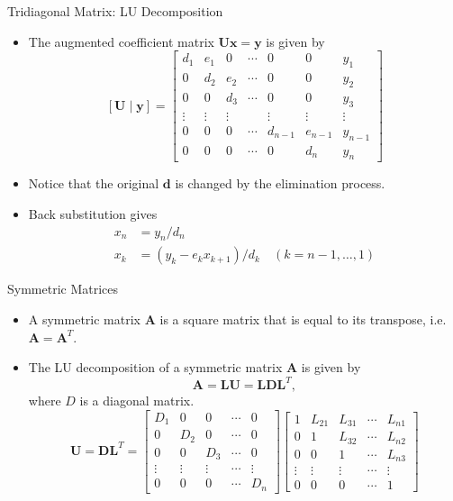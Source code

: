 \documentclass{beamer}
\begin{document}
\begin{frame}{Tridiagonal  Matrix: LU Decomposition}
  \begin{itemize}
\item  The augmented coefficient matrix $\mathbf{U}\mathbf{x}=\mathbf{y}$ is given by 
$$
[\mathbf{U} \mid \mathbf{y}]=\left[\begin{array}{cccccc|c}
d_1 & e_1 & 0 & \cdots & 0 & 0 & y_1 \\
0 & d_2 & e_2 & \cdots & 0 & 0 & y_2 \\
0 & 0 & d_3 & \cdots & 0 & 0 & y_3 \\
\vdots & \vdots & \vdots & & \vdots & \vdots & \vdots \\
0 & 0 & 0 & \cdots & d_{n-1} & e_{n-1} & y_{n-1} \\
0 & 0 & 0 & \cdots & 0 & d_n & y_n
\end{array}\right]
$$
\item Notice that the original $\mathbf{d}$ is changed by the elimination process.
\item Back substitution gives
\begin{align*}
x_n&=y_{n}/d_n\\
x_k&=(y_k-e_k x_{k+1})/d_k \quad  (k=n-1,\ldots,1)
\end{align*}

\end{itemize}
\end{frame}
\begin{frame}{Symmetric Matrices}
\begin{itemize}
\item A symmetric matrix $\mathbf{A}$ is a square matrix that is equal to its transpose, i.e. $\mathbf{A}=\mathbf{A}^T$.
\item The LU decomposition of a symmetric matrix $\mathbf{A}$ is given by
$$
\mathbf{A}=\mathbf{L} \mathbf{U}=\mathbf{L D L}^T,
$$
where $D$ is a diagonal matrix.
$$
\mathbf{U}=\mathbf{D L}^T=\left[\begin{array}{ccccc}
D_1 & 0 & 0 & \cdots & 0 \\
0 & D_2 & 0 & \cdots & 0 \\
0 & 0 & D_3 & \cdots & 0 \\
\vdots & \vdots & \vdots & \cdots & \vdots \\
0 & 0 & 0 & \cdots & D_n
\end{array}\right]\left[\begin{array}{ccccc}
1 & L_{21} & L_{31} & \cdots & L_{n 1} \\
0 & 1 & L_{32} & \cdots & L_{n 2} \\
0 & 0 & 1 & \cdots & L_{n 3} \\
\vdots & \vdots & \vdots & \cdots & \vdots \\
0 & 0 & 0 & \cdots & 1
\end{array}\right]
$$
\end{itemize}
\end{frame}
\end{document}
